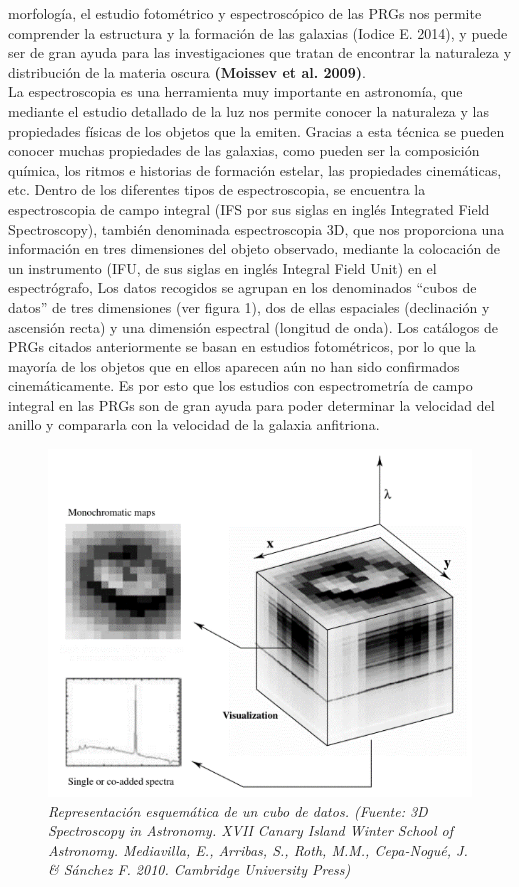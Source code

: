 \documentclass{article}
\begin{document}
morfología, el estudio fotométrico y espectroscópico de las PRGs nos permite comprender la estructura y la formación de las galaxias (Iodice E. 2014), y puede ser de gran ayuda para las investigaciones que tratan de encontrar la naturaleza y distribución de la materia oscura \cite{Brook2008} \textbf{(Moissev et al. 2009)}.\\La espectroscopia es una herramienta muy importante en astronomía, que mediante el estudio detallado de la luz nos permite conocer la naturaleza y las propiedades físicas de los objetos que la emiten. Gracias a esta técnica se pueden conocer muchas propiedades de las galaxias, como pueden ser la composición química, los ritmos e historias de formación estelar, las propiedades cinemáticas, etc. Dentro de los diferentes tipos de espectroscopia, se encuentra la espectroscopia de campo integral (IFS por sus siglas en inglés Integrated Field Spectroscopy), también denominada espectroscopia 3D, que nos proporciona una información en tres dimensiones del objeto observado, mediante la colocación de un instrumento (IFU, de sus siglas en inglés Integral Field Unit) en el espectrógrafo, Los datos recogidos se agrupan en los denominados “cubos de datos” de tres dimensiones (ver figura 1), dos de ellas espaciales (declinación y ascensión recta) y una dimensión espectral (longitud de onda). Los catálogos de PRGs citados anteriormente se basan en estudios fotométricos, por lo que la mayoría de los objetos que en ellos aparecen aún no han sido confirmados cinemáticamente. Es por esto que los estudios con espectrometría de campo integral en las PRGs son de gran ayuda para poder determinar la velocidad del anillo y compararla con la velocidad de la galaxia anfitriona.

\begin{figure}[H]
	\includegraphics[scale=.80]{imagen1.png}
	\centering	
	\caption{\emph{Representación esquemática de un cubo de datos. (Fuente: 3D Spectroscopy in Astronomy. XVII Canary Island Winter School of Astronomy. Mediavilla, E., Arribas, S., Roth, M.M., Cepa-Nogué, J. \& Sánchez F. 2010. Cambridge University Press)}}
\end{figure}
\end{document}
